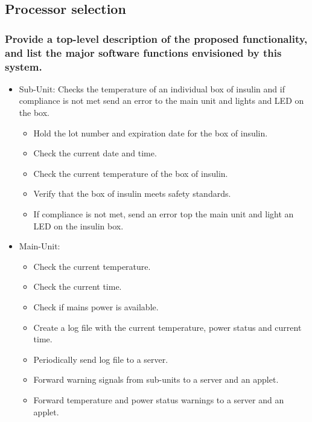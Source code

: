\documentclass[12pt]{article} \usepackage{jeep} \usepackage{unicode}
\begin{document}
\subsection{Processor selection}
\subsubsection{Provide a top-level description of the proposed functionality,
  and list the major software functions envisioned by this system.}
\begin{itemize}
  \item Sub-Unit: Checks the temperature of an individual box of insulin and if
        compliance is not met send an error to the main unit and lights and LED
        on the box.
        \begin{itemize}
          \item Hold the lot number and expiration date for the box of insulin.
          \item Check the current date and time.
          \item Check the current temperature of the box of insulin.
          \item Verify that the box of insulin meets safety standards.
          \item If compliance is not met, send an error top the main unit and
                light an LED on the insulin box.
        \end{itemize}
  \item Main-Unit:
        \begin{itemize}
          \item Check the current temperature.
          \item Check the current time.
          \item Check if mains power is available.
          \item Create a log file with the current temperature, power status and
                current time.
          \item Periodically send log file to a server.
          \item Forward warning signals from sub-units to a server and an
                applet.
          \item Forward temperature and power status warnings to a server and an
                applet.
        \end{itemize}
\end{itemize}
\end{document}
